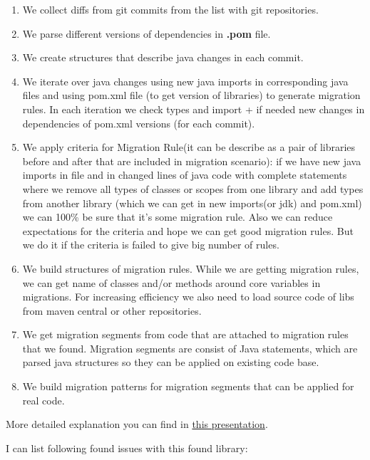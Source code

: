 \documentclass[sigplan,screen,11pt]{acmart}
\begin{document}
\begin{enumerate}
    \item We collect diffs from git commits from the list with git repositories.
    \item We parse different versions of dependencies in \textbf{.pom} file.
    \item We create structures that describe java changes in each commit.
    \item We iterate over java changes using new java imports in corresponding java files and using pom.xml file (to get version of libraries) to generate migration rules. In each iteration we check types and import + if needed new changes in dependencies of pom.xml versions (for each commit).
    \item We apply criteria for Migration Rule(it can be describe as a pair of libraries before and after that are included in migration scenario): if we have new java imports in file and in changed lines of java code with complete statements where we remove all types of classes or scopes from one library and add types from another library (which we can get in new imports(or jdk) and pom.xml) we can 100\% be sure that it’s some migration rule. Also we can reduce expectations for the criteria and hope we can get good migration rules. But we do it if the criteria is failed to give big number of rules.
    \item We build structures of migration rules. While we are getting migration rules, we can get name of classes and/or methods around core variables in migrations. For increasing efficiency we also need to load source code of libs from maven central or other repositories.
    \item We get migration segments from code that are attached to migration rules that we found. Migration segments are consist of Java statements, which are parsed java structures so they can be applied on existing code base.
    \item We build migration patterns for migration segments that can be applied for real code.
\end{enumerate}

More detailed explanation you can find in \href{https://docs.google.com/presentation/d/1ZeTIZW5zE6Li-s0tz_Dmfy-o4L_mSgZ7CkDBrQy7j34/edit?usp=sharing}{this presentation}.\newline

I can list following found issues with this found library:
\end{document}

